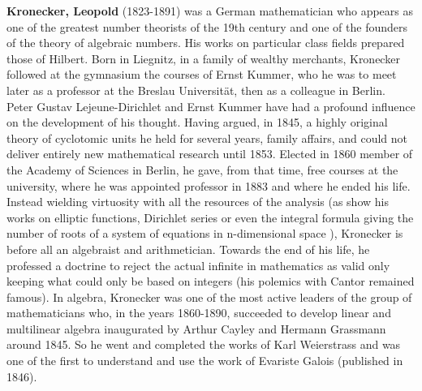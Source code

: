 \textbf{Kronecker, Leopold} (1823-1891) was a German mathematician who appears as one of the greatest number theorists of the 19th century and one of the founders of the theory of algebraic numbers. His works on particular class fields prepared those of Hilbert. Born in Liegnitz, in a family of wealthy merchants, Kronecker followed at the gymnasium the courses of Ernst Kummer, who he was to meet later as a professor at the Breslau Universität, then as a colleague in Berlin. Peter Gustav Lejeune-Dirichlet and Ernst Kummer have had a profound influence on the development of his thought. Having argued, in 1845, a highly original theory of cyclotomic units he held for several years, family affairs, and could not deliver entirely new mathematical research until 1853. Elected in 1860 member of the Academy of Sciences in Berlin, he gave, from that time, free courses at the university, where he was appointed professor in 1883 and where he ended his life. Instead wielding virtuosity with all the resources of the analysis (as show his works on elliptic functions, Dirichlet series or even the integral formula giving the number of roots of a system of equations in n-dimensional space ), Kronecker is before all an algebraist and arithmetician. Towards the end of his life, he professed a doctrine to reject the actual infinite in mathematics as valid only keeping what could only be based on integers (his polemics with Cantor remained famous). In algebra, Kronecker was one of the most active leaders of the group of mathematicians who, in the years 1860-1890, succeeded to develop linear and multilinear algebra inaugurated by Arthur Cayley and Hermann Grassmann around 1845. So he went and completed the works of Karl Weierstrass and was one of the first to understand and use the work of Evariste Galois (published in 1846).

{}
\label{sec:L}

